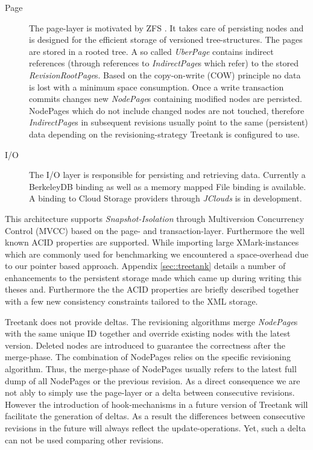 \begin{description}
\item[Page] The page-layer is motivated by ZFS \cite{ZFS}. It takes care of persisting nodes and is designed for the efficient storage of versioned tree-structures. The pages are stored in a rooted tree. A so called \emph{UberPage} contains indirect references (through references to \emph{IndirectPage}s which refer) to the stored \emph{RevisionRootPage}s. Based on the copy-on-write (COW) principle no data is lost with a minimum space consumption. Once a write transaction commits changes new \emph{NodePage}s containing modified nodes are persisted. NodePages which do not include changed nodes are not touched, therefore \emph{IndirectPage}s in subsequent revisions usually point to the same (persistent) data depending on the revisioning-strategy Treetank is configured to use.

\item[I/O] The I/O layer is responsible for persisting and retrieving data. Currently a BerkeleyDB binding as well as a memory mapped File binding is available. A binding to Cloud Storage providers through \emph{JClouds} is in development.
\end{description}

This architecture supports \emph{Snapshot-Isolation} through Multiversion Concurrency Control (MVCC) based on the page- and transaction-layer. Furthermore the well known ACID properties are supported. While importing large XMark-instances \cite{XMark} which are commonly used for benchmarking we encountered a space-overhead due to our pointer based approach. Appendix \ref{sec::treetank} details a number of enhancements to the persistent storage made which came up during writing this theses and. Furthermore the  the ACID properties are briefly described together with a few new consistency constraints tailored to the XML storage.

Treetank does not provide deltas. The revisioning algorithms merge \emph{NodePage}s with the same unique ID together and override existing nodes with the latest version. Deleted nodes are introduced to guarantee the correctness after the merge-phase. The combination of NodePages relies on the specific revisioning algorithm. Thus, the merge-phase of NodePages usually refers to the latest full dump of all NodePages or the previous revision. As a direct consequence we are not ably to simply use the page-layer or a delta between consecutive revisions. However the introduction of hook-mechanisms in a future version of Treetank will facilitate the generation of deltas. As a result the differences between consecutive revisions in the future will always reflect the update-operations. Yet, such a delta can not be used comparing other revisions.

